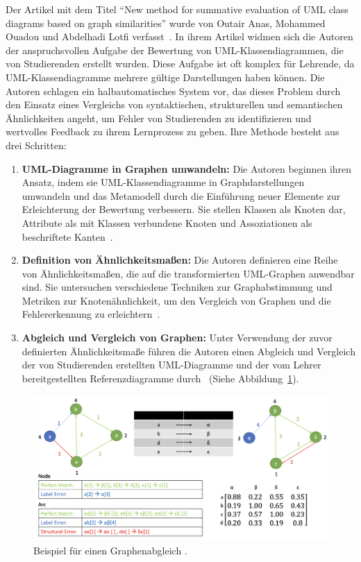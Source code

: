 Der Artikel mit dem Titel ``New method for summative evaluation of UML class diagrams based on graph similarities''
wurde von Outair Anas, Mohammed Ouadou und Abdelhadi Lotfi verfasst~\cite{anas2021new}. In ihrem Artikel widmen sich die
Autoren der anspruchsvollen Aufgabe der Bewertung von UML-Klassendiagrammen, die von Studierenden erstellt wurden. Diese
Aufgabe ist oft komplex für Lehrende, da UML-Klassendiagramme mehrere gültige Darstellungen haben können. Die Autoren
schlagen ein halbautomatisches System vor, das dieses Problem durch den Einsatz eines Vergleichs von syntaktischen,
strukturellen und semantischen Ähnlichkeiten angeht, um Fehler von Studierenden zu identifizieren und wertvolles
Feedback zu ihrem Lernprozess zu geben. Ihre Methode besteht aus drei Schritten:

\begin{enumerate}
    \item \textbf{UML-Diagramme in Graphen umwandeln:} Die Autoren beginnen ihren Ansatz, indem sie UML-Klassendiagramme
    in Graphdarstellungen umwandeln und das Metamodell durch die Einführung neuer Elemente zur Erleichterung der
    Bewertung verbessern. Sie stellen Klassen als Knoten dar, Attribute als mit Klassen verbundene Knoten und
    Assoziationen als beschriftete Kanten~\cite{auxepaules2015diagram}.

    \item \textbf{Definition von Ähnlichkeitsmaßen:} Die Autoren definieren eine Reihe von Ähnlichkeitsmaßen, die auf
    die transformierten UML-Graphen anwendbar sind. Sie untersuchen verschiedene Techniken zur Graphabstimmung und
    Metriken zur Knotenähnlichkeit, um den Vergleich von Graphen und die Fehlererkennung zu erleichtern~\cite{fauzan2018class}.

    \item \textbf{Abgleich und Vergleich von Graphen:} Unter Verwendung der zuvor definierten Ähnlichkeitsmaße führen
    die Autoren einen Abgleich und Vergleich der von Studierenden erstellten UML-Diagramme und der vom Lehrer
    bereitgestellten Referenzdiagramme durch~\cite{outair2017towards} (Siehe Abbildung~\ref{fig:graph-matching}).
\end{enumerate}


\begin{figure}
	\centering
	\includegraphics[width=15cm]{images/graph-matching}
	\caption{Beispiel für einen Graphenabgleich \cite{anas2021new}.}
	\label{fig:graph-matching}
\end{figure}

